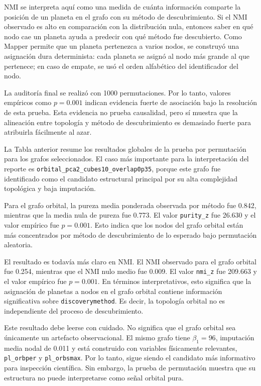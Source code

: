 NMI se interpreta aquí como una medida de cuánta información comparte la posición de un planeta en el grafo con su método de descubrimiento. Si el NMI observado es alto en comparación con la distribución nula, entonces saber en qué nodo cae un planeta ayuda a predecir con qué método fue descubierto. Como Mapper permite que un planeta pertenezca a varios nodos, se construyó una asignación dura determinista: cada planeta se asignó al nodo más grande al que pertenece; en caso de empate, se usó el orden alfabético del identificador del nodo.

La auditoría final se realizó con 1000 permutaciones. Por lo tanto, valores empíricos como \(p=0.001\) indican evidencia fuerte de asociación bajo la resolución de esta prueba. Esta evidencia no prueba causalidad, pero sí muestra que la alineación entre topología y método de descubrimiento es demasiado fuerte para atribuirla fácilmente al azar.



La Tabla anterior resume los resultados globales de la prueba por permutación para los grafos seleccionados. El caso más importante para la interpretación del reporte es \texttt{orbital\_pca2\_cubes10\_overlap0p35}, porque este grafo fue identificado como el candidato estructural principal por su alta complejidad topológica y baja imputación.

Para el grafo orbital, la pureza media ponderada observada por método fue 0.842, mientras que la media nula de pureza fue 0.773. El valor \texttt{purity\_z} fue 26.630 y el valor empírico fue \(p=0.001\). Esto indica que los nodos del grafo orbital están más concentrados por método de descubrimiento de lo esperado bajo permutación aleatoria.

El resultado es todavía más claro en NMI. El NMI observado para el grafo orbital fue 0.254, mientras que el NMI nulo medio fue 0.009. El valor \texttt{nmi\_z} fue 209.663 y el valor empírico fue \(p=0.001\). En términos interpretativos, esto significa que la asignación de planetas a nodos en el grafo orbital contiene información significativa sobre \texttt{discoverymethod}. Es decir, la topología orbital no es independiente del proceso de descubrimiento.

Este resultado debe leerse con cuidado. No significa que el grafo orbital sea únicamente un artefacto observacional. El mismo grafo tiene \(\beta_1=96\), imputación media nodal de 0.011 y está construido con variables físicamente relevantes, \texttt{pl\_orbper} y \texttt{pl\_orbsmax}. Por lo tanto, sigue siendo el candidato más informativo para inspección científica. Sin embargo, la prueba de permutación muestra que su estructura no puede interpretarse como señal orbital pura.

